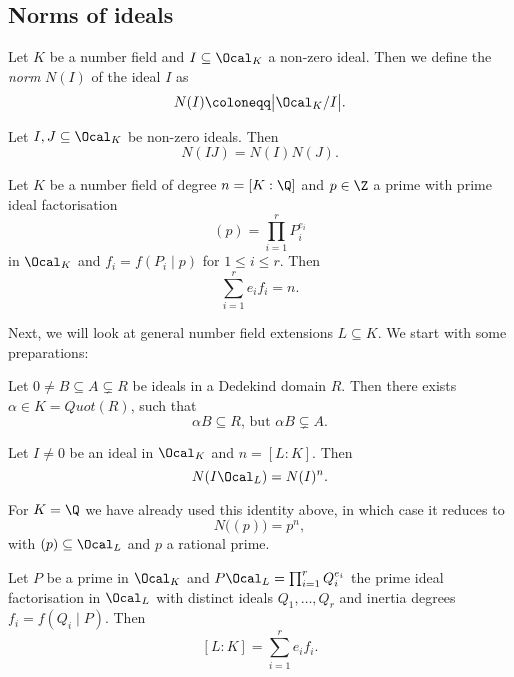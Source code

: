 
\subsection*{Norms of ideals}

\begin{defn*}
	Let \( K \) be a number field and \( I \subseteq \Ocal_K \) a non-zero ideal.
	Then we define the \emph{norm} \( N(I) \) of the ideal \( I \) as
	\[ N(I) \coloneqq \big| \Ocal_K / I \big|. \]
\end{defn*}

\begin{lem}
	Let \( I, J \subseteq \Ocal_K \) be non-zero ideals.
	Then
	\[ N(IJ) = N(I) N(J). \]
\end{lem}

\begin{prop}
	Let \( K \) be a number field of degree \( n = [K:\Q] \) and \( p \in \Z \) a prime with prime ideal factorisation
	\[ (p) = \prod_{i=1}^r P_i^{e_i} \]
	in \( \Ocal_K \) and \( f_i = f(P_i \mid p) \) for \( 1 \leq i \leq r \).
	Then
	\[ \sum_{i=1}^r e_i f_i = n. \]
\end{prop}

Next, we will look at general number field extensions \( L \subseteq K \).
We start with some preparations:

\begin{lem}
	Let \( 0 \neq B \subseteq A \subsetneq R \) be ideals in a Dedekind domain \( R \).
	Then there exists \( \alpha \in K = Quot(R) \), such that
	\[ \alpha B \subseteq R, \, \text{but } \alpha B \subsetneq A. \]
\end{lem}

\begin{lem}
	Let \( I \neq 0 \) be an ideal in \( \Ocal_K \) and \( n = [L:K] \).
	Then
	\[ N(I \Ocal_L) = N(I)^n. \]
\end{lem}

\begin{exmp*}
	For \( K = \Q \) we have already used this identity above, in which case it reduces to
	\[ N\big( (p) \big) = p^n, \]
	with \( (p) \subseteq \Ocal_L \) and \( p \) a rational prime.
\end{exmp*}

\begin{thmn}\label{thm:2.17}
	Let \( P \) be a prime in \( \Ocal_K \) and \( P \Ocal_L = \prod_{i=1}^r Q_i^{e_i} \) the prime ideal factorisation in \( \Ocal_L \) with distinct ideals \( Q_1, \dotsc, Q_r \) and inertia degrees \( f_i = f(Q_i \mid P) \).
	Then
	\[ [L:K] = \sum_{i=1}^r e_i f_i. \]
\end{thmn}

